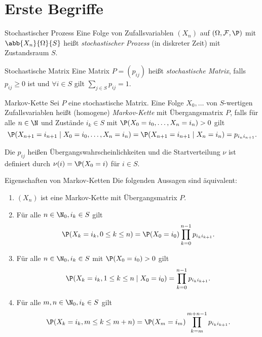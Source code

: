 \section{Erste Begriffe}

\begin{karte}{Stochastischer Prozess}
    Eine Folge von Zufallsvariablen \((X_n)\) auf 
    \((\Omega, \mathcal{F}, \P)\) mit 
    \( \abb{X_n}{\Omega}{S} \) heißt \textit{stochastischer Prozess} 
    (in diskreter Zeit) mit Zustandsraum \(S\).
\end{karte}

\begin{karte}{Stochastische Matrix}
    Eine Matrix \(P = (p_{ij})\) heißt \textit{stochastische Matrix}, 
    falls \(p_{ij} \geq 0\) ist und \( \forall i \in S \) gilt 
    \( \sum_{j\in S} p_{ij} = 1 \).
\end{karte}

\begin{karte}{Markov-Kette}
    Sei \(P\) eine stochastische Matrix. 
    Eine Folge \(X_0, \ldots\) von \(S\)-wertigen 
    Zufallsvariablen heißt (homogene) \textit{Markov-Kette} 
    mit Übergangsmatrix \(P\), falls für alle \(n\in\N\) 
    und Zustände \(i_k\in S\) mit \( \P(X_0 = i_0, \ldots, X_n = i_n) > 0 \) 
    gilt 
    \[ \P(X_{n+1} = i_{n+1} \;|\; X_0 = i_0, \ldots, X_n = i_n) 
    = \P(X_{n+1} = i_{n+1} \;|\; X_n = i_n) = p_{i_n i_{n+1}}. \]

    Die \(p_{ij}\) heißen Übergangswahrscheinlichkeiten und die 
    Startverteilung \(\nu\) ist definiert durch \(\nu(i) = \P(X_0 = i)\) 
    für \(i\in S\).
\end{karte}

\begin{karte}{Eigenschaften von Markov-Ketten}
    Die folgenden Aussagen sind äquivalent:
    \begin{enumerate}
        \item \((X_n)\) ist eine Markov-Kette mit Übergangsmatrix \(P\).
        \item Für alle \(n\in \N_0, i_k \in S\) gilt 
        \[ \P(X_k = i_k, 0\leq k \leq n) = \P(X_0 = i_0) 
        \prod_{k=0}^{n-1} p_{i_ki_{k+1}}.  \]
        \item Für alle \(n\in \N_0, i_k\in S\) mit 
        \(\P(X_0 = i_0)>0\) gilt 
        \[ \P(X_k = i_k, 1\leq k \leq n \;|\; X_0 = i_0) = \prod_{k=0}^{n-1} p_{i_k i_{k+1}}. \]
        \item Für alle \(m,n\in\N_0, i_k \in S\) gilt 
        \[ \P(X_k = i_k, m \leq k \leq m+n) = \P(X_m = i_m) 
        \prod_{k=m}^{m+n-1} p_{i_k i_{k+1}}. \]
    \end{enumerate}
\end{karte}

